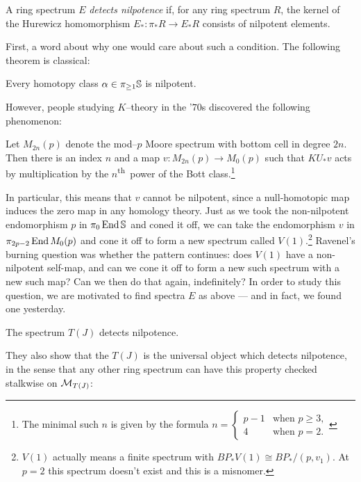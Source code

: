 \begin{definition}
A ring spectrum $E$ \textit{detects nilpotence} if, for any ring spectrum $R$, the kernel of the Hurewicz homomorphism $E_*: \pi_* R \to E_* R$ consists of nilpotent elements.
\end{definition}

First, a word about why one would care about such a condition.  The following theorem is classical:
\begin{theorem}[Nishida]
Every homotopy class $\alpha \in \pi_{\ge 1} \S$ is nilpotent.
\end{theorem}

\noindent However, people studying $K$--theory in the '$70$s discovered the following phenomenon:

\begin{theorem}[Adams]
Let $M_{2n}(p)$ denote the mod--$p$ Moore spectrum with bottom cell in degree $2n$.  Then there is an index $n$ and a map $v: M_{2n}(p) \to M_0(p)$ such that $KU_* v$ acts by multiplication by the $n$\textsuperscript{th}\, power of the Bott class.\footnote{The minimal such $n$ is given by the formula $n = \begin{cases} p-1 & \text{when $p \ge 3$}, \\ 4 & \text{when $p = 2$}. \end{cases}$}
\end{theorem}

\noindent In particular, this means that $v$ cannot be nilpotent, since a null-homotopic map induces the zero map in any homology theory.  Just as we took the non-nilpotent endomorphism $p$ in $\pi_0 \End \S$ and coned it off, we can take the endomorphism $v$ in $\pi_{2p-2} \End M_0(p)$ and cone it off to form a new spectrum called $V(1)$.\footnote{$V(1)$ actually means a finite spectrum with $BP_* V(1) \cong BP_* / (p, v_1)$. At $p = 2$ this spectrum doesn't exist and this is a misnomer.}  Ravenel's burning question was whether the pattern continues: does $V(1)$ have a non-nilpotent self-map, and can we cone it off to form a new such spectrum with a new such map?  Can we then do that again, indefinitely?  In order to study this question, we are motivated to find spectra $E$ as above --- and in fact, we found one yesterday.

\begin{theorem}
The spectrum $T(J)$ detects nilpotence.
\end{theorem}

They also show that the $T(J)$ is the universal object which detects nilpotence, in the sense that any other ring spectrum can have this property checked stalkwise on $\M_{T(J)}$:

